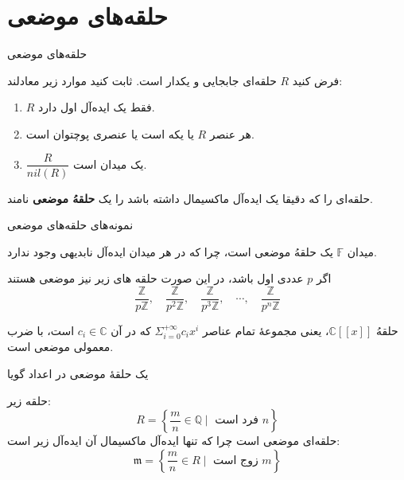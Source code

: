 \section{حلقه‌های موضعی}

\begin{frame}[t]{حلقه‌های موضعی}
    \begin{exercise}
        فرض کنید \( R \) حلقه‌ای جابجایی و یکدار است. ثابت کنید موارد زیر معادلند:
        \begin{enumerate}
            \item \( R \) فقط یک ایده‌آل اول دارد.
            \item هر عنصر  \( R \) یا یکه است یا عنصری پوچتوان است.
            \item \( \dfrac{R}{nil(R)} \) یک میدان است.
        \end{enumerate}
    \end{exercise}

    \begin{definition}
        حلقه‌ای را که دقیقا یک ایده‌آل ماکسیمال داشته باشد را یک
        \textbf{حلقهُ موضعی}
        نامند.
    \end{definition}


\end{frame}

\begin{frame}[t]{نمونه‌های حلقه‌های موضعی}
    \begin{example}
        میدان
        \(\mathbb{F} \)
        یک حلقهُ موضعی است،
        چرا که در هر میدان ایده‌آل نابدیهی وجود ندارد.
    \end{example}

    \begin{example}
        اگر
        \(p\)
        عددی اول باشد،‌ در این صورت حلقه های زیر نیز موضعی هستند
        \[\frac{\mathbb{Z}}{p\mathbb{Z}}, \quad\frac{\mathbb{Z}}{p^2\mathbb{Z}}, \quad\frac{\mathbb{Z}}{p^3\mathbb{Z}}, \quad\cdots,\quad \frac{\mathbb{Z}}{p^n\mathbb{Z}}\]
    \end{example}


    \begin{example}
        حلقهُ
        \(\mathbb{C}[[x]]\)،
        یعنی مجموعهٔ تمام عناصر
        \(\Sigma_{i=0}^{+\infty} c_ix^i\)
        که در آن
        \(c_i \in \mathbb{C}\)
        است، با ضرب معمولی موضعی است.
    \end{example}

\end{frame}

\begin{frame}[t]{یک حلقهٔ موضعی در اعداد گویا}
    \begin{example}
        حلقه زیر:
        \[
            R = \left\{ \frac{m}{n} \in \mathbb{Q} \mid \text{ فرد است } n \right\}
        \]
        حلقه‌ای موضعی است چرا که تنها ایده‌آل ماکسیمال آن ایده‌آل زیر است:
        \[
            \mathfrak{m} = \left\{ \frac{m}{n} \in R \mid \text{ زوج است } m \right\}
        \]
    \end{example}


\end{frame}

